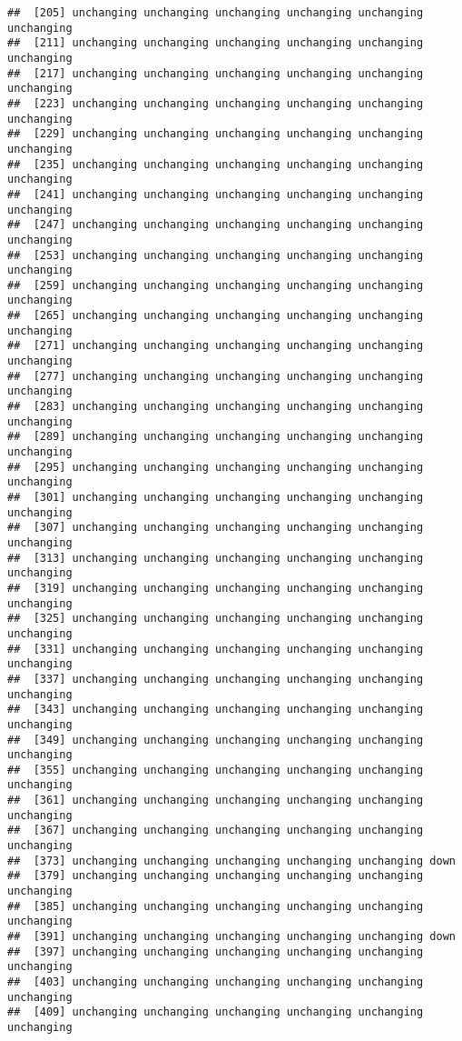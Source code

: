 \documentclass[]{article}
\begin{document}
\begin{verbatim}
##  [205] unchanging unchanging unchanging unchanging unchanging unchanging
##  [211] unchanging unchanging unchanging unchanging unchanging unchanging
##  [217] unchanging unchanging unchanging unchanging unchanging unchanging
##  [223] unchanging unchanging unchanging unchanging unchanging unchanging
##  [229] unchanging unchanging unchanging unchanging unchanging unchanging
##  [235] unchanging unchanging unchanging unchanging unchanging unchanging
##  [241] unchanging unchanging unchanging unchanging unchanging unchanging
##  [247] unchanging unchanging unchanging unchanging unchanging unchanging
##  [253] unchanging unchanging unchanging unchanging unchanging unchanging
##  [259] unchanging unchanging unchanging unchanging unchanging unchanging
##  [265] unchanging unchanging unchanging unchanging unchanging unchanging
##  [271] unchanging unchanging unchanging unchanging unchanging unchanging
##  [277] unchanging unchanging unchanging unchanging unchanging unchanging
##  [283] unchanging unchanging unchanging unchanging unchanging unchanging
##  [289] unchanging unchanging unchanging unchanging unchanging unchanging
##  [295] unchanging unchanging unchanging unchanging unchanging unchanging
##  [301] unchanging unchanging unchanging unchanging unchanging unchanging
##  [307] unchanging unchanging unchanging unchanging unchanging unchanging
##  [313] unchanging unchanging unchanging unchanging unchanging unchanging
##  [319] unchanging unchanging unchanging unchanging unchanging unchanging
##  [325] unchanging unchanging unchanging unchanging unchanging unchanging
##  [331] unchanging unchanging unchanging unchanging unchanging unchanging
##  [337] unchanging unchanging unchanging unchanging unchanging unchanging
##  [343] unchanging unchanging unchanging unchanging unchanging unchanging
##  [349] unchanging unchanging unchanging unchanging unchanging unchanging
##  [355] unchanging unchanging unchanging unchanging unchanging unchanging
##  [361] unchanging unchanging unchanging unchanging unchanging unchanging
##  [367] unchanging unchanging unchanging unchanging unchanging unchanging
##  [373] unchanging unchanging unchanging unchanging unchanging down      
##  [379] unchanging unchanging unchanging unchanging unchanging unchanging
##  [385] unchanging unchanging unchanging unchanging unchanging unchanging
##  [391] unchanging unchanging unchanging unchanging unchanging down      
##  [397] unchanging unchanging unchanging unchanging unchanging unchanging
##  [403] unchanging unchanging unchanging unchanging unchanging unchanging
##  [409] unchanging unchanging unchanging unchanging unchanging unchanging

\end{verbatim}
\end{document}
